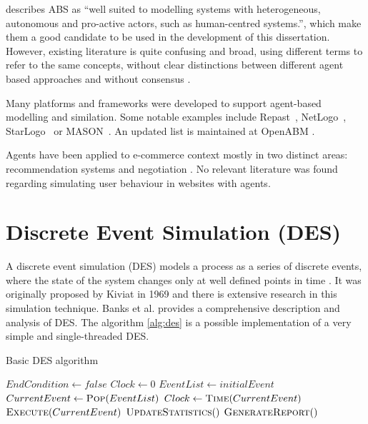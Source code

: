 \cite{Siebers2010} describes ABS as ``well suited to modelling systems with 
heterogeneous, autonomous and pro-active actors, such as human-centred 
systems.'', which make them a good candidate to be used in the development of 
this dissertation. However, existing literature is quite confusing and broad, 
using different terms to refer to the same concepts, without clear 
distinctions between different agent based approaches and without consensus 
\cite{Niazi2011, Brailsford2014}.

Many platforms and frameworks were developed to support agent-based modelling 
and similation. Some notable examples include Repast~\cite{collier2003repast}, 
NetLogo~\cite{wilensky1999netlogo}, StarLogo~\cite{resnick1996starlogo} or 
MASON~\cite{panait2005cooperative}. An updated list is maintained at OpenABM 
\cite{OpenABM2016}.

Agents have been applied to e-commerce context mostly in two distinct areas: 
recommendation systems \cite{xiao2007commerce, walter2008model} and negotiation 
\cite{rahwan2002intelligent, maes1999agents}. No relevant literature was found 
regarding simulating user behaviour in websites with agents.

\section{Discrete Event Simulation (DES)}

A discrete event simulation (DES) models a process as a series of discrete 
events, where the state of the system changes only at well defined points in 
time \cite{Siebers2010}. It was originally proposed by Kiviat in 1969 
\cite{Kiviat1969} and there is extensive research in this simulation technique. 
Banks et al. \cite{Banks2004} provides a comprehensive description and analysis 
of DES. The algorithm \ref{alg:des} is a possible implementation of a very 
simple and single-threaded DES.

\begin{algorithm}[h]
    \caption{Basic DES algorithm}
    \label{alg:des}
    \begin{algorithmic}
        \State $EndCondition \gets false$
        \State $Clock \gets 0$
        \State $EventList \gets initialEvent$
        \State $CurrentEvent \gets \Call{Pop}{EventList}$
        \State $Clock \gets \Call{Time}{CurrentEvent}$
        \State $\Call{Execute}{CurrentEvent}$ 
        \State $\Call{UpdateStatistics}$
        \EndWhile
        \State $\Call{GenerateReport}$
    \end{algorithmic}
\end{algorithm}

